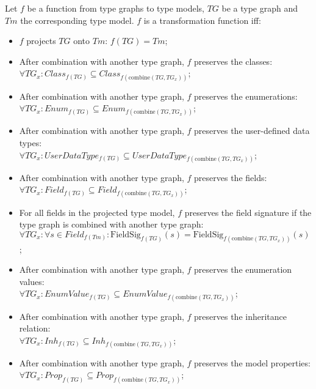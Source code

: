 \begin{defin}
\label{defin:transformation_framework:type_models_and_type_graphs:combining_transformation_functions:transformation_function_type_graph_type_model}
Let $f$ be a function from type graphs to type models, $TG$ be a type graph and $Tm$ the corresponding type model. $f$ is a transformation function iff:
\begin{itemize}
    \item $f$ projects $TG$ onto $Tm$: $f(TG) = Tm$;
    \item After combination with another type graph, $f$ preserves the classes:\\$\forall TG_x\!: Class_{f(TG)} \subseteq Class_{f(\mathrm{combine}(TG, TG_x))}$;
    \item After combination with another type graph, $f$ preserves the enumerations:\\$\forall TG_x\!: Enum_{f(TG)} \subseteq Enum_{f(\mathrm{combine}(TG, TG_x))}$;
    \item After combination with another type graph, $f$ preserves the user-defined data types:\\$\forall TG_x\!: UserDataType_{f(TG)} \subseteq UserDataType_{f(\mathrm{combine}(TG, TG_x))}$;
    \item After combination with another type graph, $f$ preserves the fields:\\$\forall TG_x\!: Field_{f(TG)} \subseteq Field_{f(\mathrm{combine}(TG, TG_x))}$;
    \item For all fields in the projected type model, $f$ preserves the field signature if the type graph is combined with another type graph:\\$\forall TG_x\!: \forall s \in Field_{f(Tm)}\!: \mathrm{FieldSig}_{f(TG)}(s) = \mathrm{FieldSig}_{f(\mathrm{combine}(TG, TG_x))}(s)$;
    \item After combination with another type graph, $f$ preserves the enumeration values:\\$\forall TG_x\!: EnumValue_{f(TG)} \subseteq EnumValue_{f(\mathrm{combine}(TG, TG_x))}$;
    \item After combination with another type graph, $f$ preserves the inheritance relation:\\$\forall TG_x\!: Inh_{f(TG)} \subseteq Inh_{f(\mathrm{combine}(TG, TG_x))}$;
    \item After combination with another type graph, $f$ preserves the model properties:\\$\forall TG_x\!: Prop_{f(TG)} \subseteq Prop_{f(\mathrm{combine}(TG, TG_x))}$;

\end{itemize}
\end{defin}
